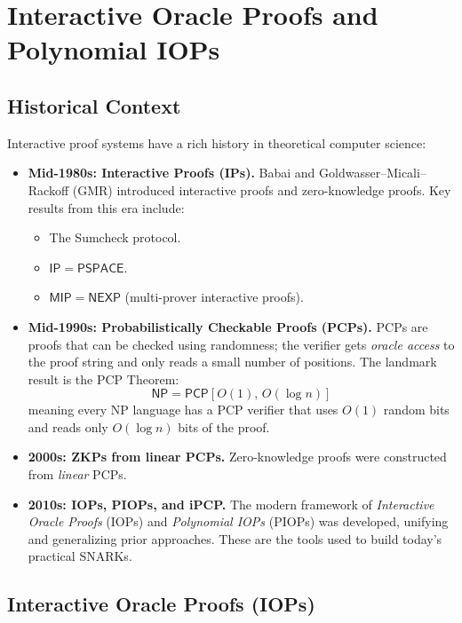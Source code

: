 \documentclass[11pt]{article}
\begin{document}
\section{Interactive Oracle Proofs and Polynomial IOPs}

\subsection{Historical Context}

Interactive proof systems have a rich history in theoretical computer science:

\begin{itemize}
  \item \textbf{Mid-1980s: Interactive Proofs (IPs).}
    Babai and Goldwasser--Micali--Rackoff (GMR) introduced interactive proofs
    and zero-knowledge proofs. Key results from this era include:
    \begin{itemize}
      \item The Sumcheck protocol.
      \item $\mathsf{IP} = \mathsf{PSPACE}$.
      \item $\mathsf{MIP} = \mathsf{NEXP}$ (multi-prover interactive proofs).
    \end{itemize}

  \item \textbf{Mid-1990s: Probabilistically Checkable Proofs (PCPs).}
    PCPs are proofs that can be checked using randomness; the verifier gets
    \emph{oracle access} to the proof string and only reads a small number of
    positions. The landmark result is the PCP Theorem:
    \[
      \mathsf{NP} = \mathsf{PCP}[O(1),\, O(\log n)]
    \]
    meaning every NP language has a PCP verifier that uses $O(1)$ random bits
    and reads only $O(\log n)$ bits of the proof.

  \item \textbf{2000s: ZKPs from linear PCPs.}
    Zero-knowledge proofs were constructed from \emph{linear} PCPs.

  \item \textbf{2010s: IOPs, PIOPs, and iPCP.}
    The modern framework of \emph{Interactive Oracle Proofs} (IOPs) and
    \emph{Polynomial IOPs} (PIOPs) was developed, unifying and generalizing
    prior approaches. These are the tools used to build today's practical SNARKs.
\end{itemize}

\subsection{Interactive Oracle Proofs (IOPs)}
\end{document}
